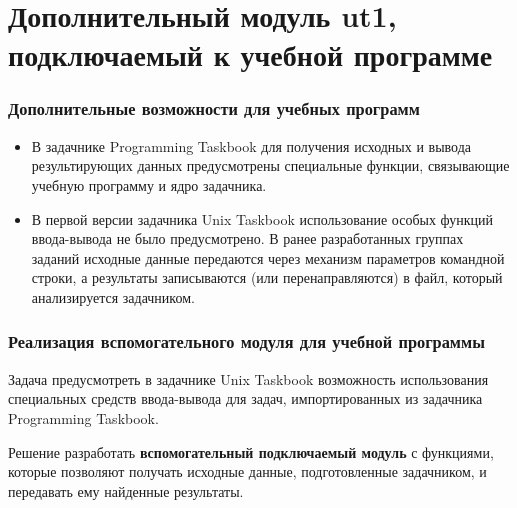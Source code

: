 \section{Дополнительный модуль ut1, подключаемый к учебной программе}



\begin{frame}
\frametitle{Дополнительные возможности для учебных программ}

\begin{itemize}
\item В задачнике Programming Taskbook для получения исходных и вывода результирующих данных предусмотрены специальные функции, связывающие учебную программу и ядро задачника.
\item В первой версии задачника Unix Taskbook использование особых функций ввода-вывода не было предусмотрено. В ранее разработанных группах заданий исходные данные передаются через механизм параметров командной строки, а результаты записываются (или перенаправляются) в файл, который анализируется задачником.
\end{itemize}

\end{frame}


\begin{frame}
\frametitle{Реализация вспомогательного модуля для учебной программы}
\begin{block}{Задача}
предусмотреть в задачнике Unix Taskbook возможность использования специальных средств ввода-вывода для задач, импортированных из задачника Programming Taskbook.
\end{block}

\begin{block}{Решение}
    разработать \textbf{вспомогательный подключаемый модуль} с функциями, которые позволяют получать исходные данные, подготовленные задачником, и передавать ему найденные результаты.
\end{block}


\end{frame}


